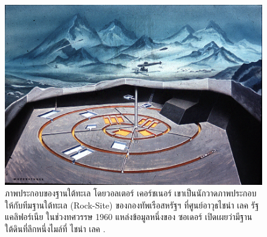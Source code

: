 \documentclass[10pt,twocolumn,letterpaper]{article}
\begin{document}
\begin{figure}[t]
\begin{center}
   \includegraphics[width=1\linewidth]{undersea.jpg}
\end{center}
   \caption{ภาพประกอบของฐานใต้ทะเล โดยวอลเตอร์ เคอร์ชเนอร์ เขาเป็นนักวาดภาพประกอบให้กับทีมฐานใต้ทะเล (Rock-Site) ของกองทัพเรือสหรัฐฯ ที่ศูนย์อาวุธไชน่า เลค รัฐแคลิฟอร์เนีย ในช่วงทศวรรษ 1960 แหล่งข้อมูลหนึ่งของ ซอเดอร์ เปิดเผยว่ามีฐานใต้ดินที่ลึกหนึ่งไมล์ที่ ไชน่า เลค \cite{22,23}.}
\label{fig:5}
\label{fig:onecol}
\end{figure}
\end{document}
